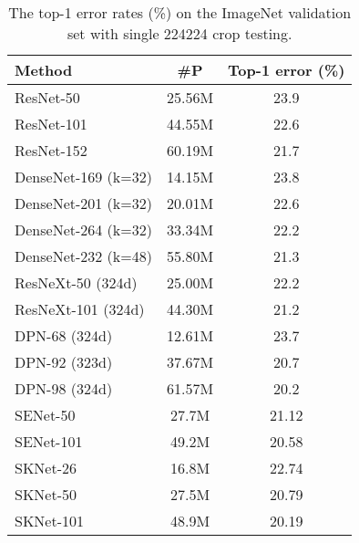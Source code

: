 \documentclass[10pt,twocolumn,letterpaper]{article}
\begin{document}
\begin{table}[h]
	\small
\centering
	\renewcommand\arraystretch{1.4}
	\newcommand{\tabincell}[2]{\begin{tabular}{@{}#1@{}}#2\end{tabular}}
	\begin{tabular}{l|c|c}
		\hline
		Method & \#P & Top-1 error (\%)\\
\hline
		ResNet-50 \cite{he2016deep} & 25.56M & 23.9 \\
		ResNet-101 \cite{he2016deep} & 44.55M & 22.6 \\
		ResNet-152 \cite{he2016deep} & 60.19M & 21.7 \\
		\hline
		DenseNet-169 (k=32) \cite{huang2017densely} & 14.15M & 23.8 \\
		DenseNet-201 (k=32) \cite{huang2017densely} & 20.01M & 22.6\\
		DenseNet-264 (k=32) \cite{huang2017densely} & 33.34M & 22.2 \\
		DenseNet-232 (k=48) \cite{huang2017densely} &55.80M&21.3\\
		\hline
		ResNeXt-50 (324d) \cite{xie2017aggregated} & 25.00M & 22.2 \\
		ResNeXt-101 (324d) \cite{xie2017aggregated} & 44.30M & 21.2 \\
		\hline
		DPN-68 (324d) \cite{chen2017dual} & 12.61M & 23.7 \\
		DPN-92 (323d) \cite{chen2017dual} & 37.67M & 20.7 \\
		DPN-98 (324d) \cite{chen2017dual} & 61.57M & 20.2 \\
		\hline
		SENet-50 \cite{hu2017squeeze} &27.7M&21.12\\
		SENet-101 \cite{hu2017squeeze}&49.2M&20.58\\
		\hline
		SKNet-26 &16.8M&22.74\\
		SKNet-50 &27.5M&20.79\\
		SKNet-101 &48.9M&20.19\\
		\hline
	\end{tabular}
	\vspace{+4pt}
	\caption{{The top-1 error rates (\%) on the ImageNet validation set with single 224224 crop testing.}}
	\label{tab_imagenet}
	\vspace{-6pt}
\end{table}
\end{document}
